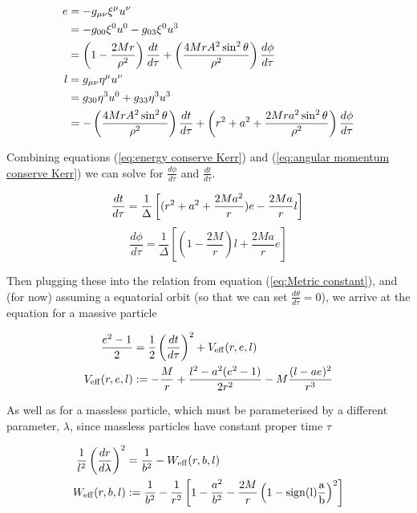 \documentclass{article}
\begin{document}
\begin{alignat}{2}
    e  &= -g_{\mu \nu} \xi^{\mu} u^{\nu} \notag \\
       &= -g_{00}  \xi^0 u^0 - g_{03} \xi^0 u^3 \notag \\
       &= \left(1-\frac{2Mr}{\rho^2}\right) \frac{dt}{d\tau} + \left( \frac{4Mr A^2 \sin^2{\theta}}{\rho^2} \right)\frac{d\phi}{d\tau}  \label{eq:energy conserve Kerr} \\
    l &=g_{\mu \nu} \eta^{\mu} u^{\nu} \notag \\
      &= g_{30}  \eta^3 u^0 + g_{33} \eta^3 u^3 \notag \\
      &= - \left(\frac{4Mr A^2 \sin^2{\theta}}{\rho^2} \right) \frac{dt}{d\tau} + \left( r^2+a^2+\frac{2 M r a^2 \sin^2{\theta}}{\rho^2} \right) \frac{d\phi}{d\tau}
      \label{eq:angular momentum conserve Kerr}
\end{alignat}

Combining equations (\ref{eq:energy conserve Kerr}) and (\ref{eq:angular momentum conserve Kerr}) we can solve for $\frac{d\phi}{d\tau}$ and $\frac{dt}{d\tau}$.

\begin{equation}
    \frac{dt}{d\tau} =
        \frac{1}{\Delta}\left[(r^2+a^2+\frac{2 M a^2}{r}) e - \frac{2 M a}{r} l \right] \\
\end{equation}\label{eq:Kerr dtdtau}
\begin{equation}
    \frac{d\phi}{d\tau} =
        \frac{1}{\Delta} \left[ \left( 1-\frac{2 M}{r}
 \right) l+\frac{2 M a}{r} e \right]
\end{equation}\label{eq:Kerr dphidtau}

Then plugging these into the relation from equation (\ref{eq:Metric constant}), and (for now) assuming a equatorial orbit (so that we can set $\frac{d
\theta}{d\tau}=0$), we arrive at the equation for a massive particle

\begin{alignat}{2}
    \frac{e^2-1}{2} &= \frac{1}{2} \left(\frac{dt}{d\tau} \right)^2 + V_{\rm{eff}} (r, e, l) \\
    V_{\rm{eff}} (r, e, l) &:= - \frac{M}{r} + \frac{l^2 - a^2 (e^2-1)}{2 r^2} - M \frac{(l - a e)^2}{r^3}
\end{alignat}

As well as for a massless particle, which must be parameterised by a different parameter, $\lambda$, since massless particles have constant proper time $\tau$

\begin{alignat}{2}
    \frac{1}{l^2} \left( \frac{dr}{d\lambda} \right)^2 &= \frac{1}{b^2} - W_{\rm{eff}} (r, b, l) \\
    W_{\rm{eff}} (r, b, l) &:= \frac{1}{b^2} - \frac{1}{r^2} \left[  1-\frac{a^2}{b^2} -\frac{2M}{r} \left(  1-\rm{sign}(l) \frac{a}{b}   \right)^2  \right]
\end{alignat}
\end{document}
